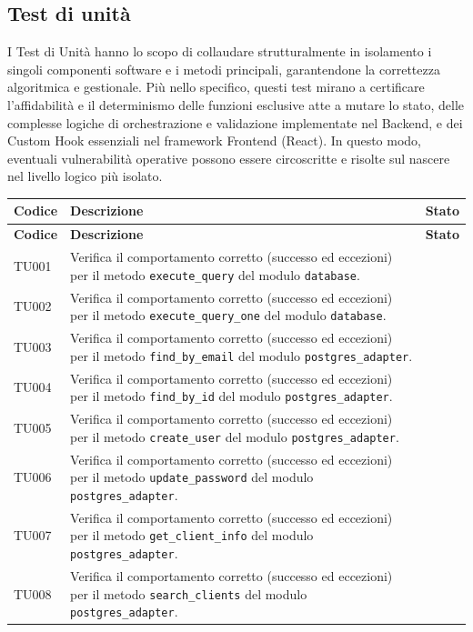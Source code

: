 \documentclass[a4paper,11pt,oneside]{scrartcl}
\begin{document}
\subsection{Test di unità}
I Test di Unità hanno lo scopo di collaudare strutturalmente in isolamento i singoli componenti software e i metodi principali, garantendone la correttezza algoritmica e gestionale. Più nello specifico, questi test mirano a certificare l'affidabilità e il determinismo delle funzioni esclusive atte a mutare lo stato, delle complesse logiche di orchestrazione e validazione implementate nel Backend, e dei Custom Hook essenziali nel framework Frontend (React). In questo modo, eventuali vulnerabilità operative possono essere circoscritte e risolte sul nascere nel livello logico più isolato.
\begin{longtable}{|p{1.9cm}|p{11.6cm}|c|}
\hline
\rowcolor[gray]{0.9}
\textbf{Codice} & \textbf{Descrizione} & \textbf{Stato} \\
\hline
\endfirsthead
\hline
\rowcolor[gray]{0.9}
\textbf{Codice} & \textbf{Descrizione} & \textbf{Stato} \\
\hline
\endhead
TU001 & Verifica il comportamento corretto (successo ed eccezioni) per il metodo \texttt{execute\_query} del modulo \texttt{database}. & \\ \hline
TU002 & Verifica il comportamento corretto (successo ed eccezioni) per il metodo \texttt{execute\_query\_one} del modulo \texttt{database}. & \\ \hline
TU003 & Verifica il comportamento corretto (successo ed eccezioni) per il metodo \texttt{find\_by\_email} del modulo \texttt{postgres\_adapter}. & \\ \hline
TU004 & Verifica il comportamento corretto (successo ed eccezioni) per il metodo \texttt{find\_by\_id} del modulo \texttt{postgres\_adapter}. & \\ \hline
TU005 & Verifica il comportamento corretto (successo ed eccezioni) per il metodo \texttt{create\_user} del modulo \texttt{postgres\_adapter}. & \\ \hline
TU006 & Verifica il comportamento corretto (successo ed eccezioni) per il metodo \texttt{update\_password} del modulo \texttt{postgres\_adapter}. & \\ \hline
TU007 & Verifica il comportamento corretto (successo ed eccezioni) per il metodo \texttt{get\_client\_info} del modulo \texttt{postgres\_adapter}. & \\ \hline
TU008 & Verifica il comportamento corretto (successo ed eccezioni) per il metodo \texttt{search\_clients} del modulo \texttt{postgres\_adapter}. & \\ \hline

\end{longtable}
\end{document}
